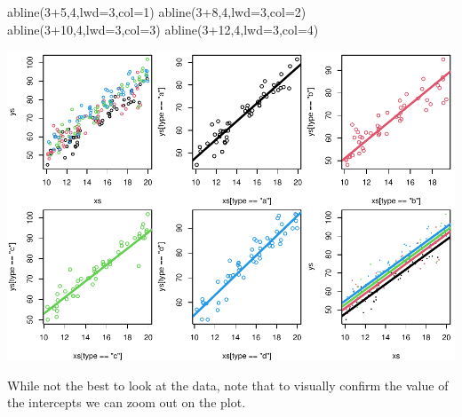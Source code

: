\documentclass[
]{book}
\newenvironment{Shaded}{\begin{snugshade}}{\end{snugshade}}
\newcommand{\AttributeTok}[1]{\textcolor[rgb]{0.77,0.63,0.00}{#1}}
\newcommand{\DecValTok}[1]{\textcolor[rgb]{0.00,0.00,0.81}{#1}}
\newcommand{\FunctionTok}[1]{\textcolor[rgb]{0.00,0.00,0.00}{#1}}
\newcommand{\NormalTok}[1]{#1}
\newcommand{\SpecialCharTok}[1]{\textcolor[rgb]{0.00,0.00,0.00}{#1}}
\begin{document}
\begin{Shaded}
\begin{Highlighting}[]
\FunctionTok{abline}\NormalTok{(}\DecValTok{3}\SpecialCharTok{+}\DecValTok{5}\NormalTok{,}\DecValTok{4}\NormalTok{,}\AttributeTok{lwd=}\DecValTok{3}\NormalTok{,}\AttributeTok{col=}\DecValTok{1}\NormalTok{)}
\FunctionTok{abline}\NormalTok{(}\DecValTok{3}\SpecialCharTok{+}\DecValTok{8}\NormalTok{,}\DecValTok{4}\NormalTok{,}\AttributeTok{lwd=}\DecValTok{3}\NormalTok{,}\AttributeTok{col=}\DecValTok{2}\NormalTok{)}
\FunctionTok{abline}\NormalTok{(}\DecValTok{3}\SpecialCharTok{+}\DecValTok{10}\NormalTok{,}\DecValTok{4}\NormalTok{,}\AttributeTok{lwd=}\DecValTok{3}\NormalTok{,}\AttributeTok{col=}\DecValTok{3}\NormalTok{)}
\FunctionTok{abline}\NormalTok{(}\DecValTok{3}\SpecialCharTok{+}\DecValTok{12}\NormalTok{,}\DecValTok{4}\NormalTok{,}\AttributeTok{lwd=}\DecValTok{3}\NormalTok{,}\AttributeTok{col=}\DecValTok{4}\NormalTok{)}
\end{Highlighting}
\end{Shaded}

\includegraphics{ECOMODbook_files/figure-latex/a9.2-1.pdf}

While not the best to look at the data, note that to visually confirm the value of the intercepts we can zoom out on the plot.
\end{document}
